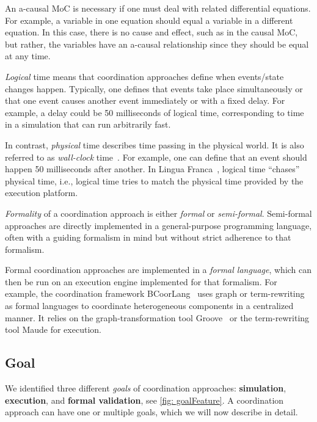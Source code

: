 \documentclass[runningheads]{llncs}
\newcommand{\quotes}[1]{``#1''}
\begin{document}
An a-causal MoC is necessary if one must deal with related differential equations.
For example, a variable in one equation should equal a variable in a different equation.
In this case, there is no cause and effect, such as in the causal MoC, but rather, the variables have an a-causal relationship since they should be equal at any time.

\textit{Logical} time means that coordination approaches define when events/state changes happen.
Typically, one defines that events take place simultaneously or that one event causes another event immediately or with a fixed delay.
For example, a delay could be 50 milliseconds of logical time, corresponding to time in a simulation that can run arbitrarily fast.

In contrast, \textit{physical} time describes time passing in the physical world.
It is also referred to as \textit{wall-clock} time~\cite{gomesCoSimulationSurvey2019}.
For example, one can define that an event should happen 50 milliseconds after another.
In Lingua Franca~\cite{lohstrohReactorsDeterministicModel2020}, logical time \quotes{chases} physical time, i.e., logical time tries to match the physical time provided by the execution platform.

\textit{Formality} of a coordination approach is either \textit{formal} or \textit{semi-formal}.
Semi-formal approaches are directly implemented in a general-purpose programming language, often with a guiding formalism in mind but without strict adherence to that formalism.

Formal coordination approaches are implemented in a \textit{formal language}, which can then be run on an execution engine implemented for that formalism.
For example, the coordination framework BCoorLang~\cite{krauterBehavioralConsistencyMultimodeling2023} uses graph or term-rewriting as formal languages to coordinate heterogeneous components in a centralized manner.
It relies on the graph-transformation tool Groove~\cite{rensinkGROOVESimulatorTool2004} or the term-rewriting tool Maude for execution.


\subsection{Goal} %
We identified three different \textit{goals} of coordination approaches: \textbf{simulation}, \textbf{execution}, and \textbf{formal validation}, see \autoref{fig: goalFeature}.
A coordination approach can have one or multiple goals, which we will now describe in detail.
\end{document}
